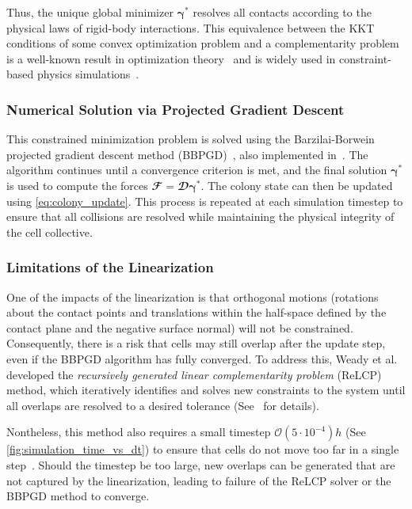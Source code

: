 \documentclass[conference]{IEEEtran}
\begin{document}
Thus, the unique global minimizer $ \boldsymbol{\gamma}^* $ resolves all contacts according to the physical laws of rigid-body interactions. This equivalence between the KKT conditions
of some convex optimization problem and a complementarity problem is a well-known result in
optimization theory~\cite{Nocedal2006} and is widely used in constraint-based physics simulations~\cite{Yan2022,Tasora2008, Yan2019, Li2021, Weady2024SM,Rudge2012,Macklin2014,Ferguson2021}.



\subsubsection{Numerical Solution via Projected Gradient Descent}

This constrained minimization problem is solved using the Barzilai-Borwein projected gradient descent method (BBPGD)~\cite{BBPGD}, also implemented in~\cite{Weady2024SM,Yan2019}. The algorithm continues until a convergence criterion is met, and the final solution $\boldsymbol{\gamma}^*$ is used to compute the forces $\mathbfcal{F} = \mathbfcal{D}\boldsymbol{\gamma}^*$. The colony state can then be updated using \autoref{eq:colony_update}. This process is repeated at each simulation timestep to ensure that all collisions are resolved while maintaining the physical integrity of the cell collective.

\subsubsection{Limitations of the Linearization}

One of the impacts of the linearization is that orthogonal motions (rotations about the contact points and translations within the half-space defined by the contact plane and the negative surface normal) will not be constrained. Consequently, there is a risk that cells may still overlap after the update step, even if the BBPGD algorithm has fully converged. To address this, Weady et al.~\cite{Weady2024SM} developed the \textit{recursively generated linear complementarity problem} (ReLCP) method, which iteratively identifies and solves new constraints to the system until all overlaps are resolved to a desired tolerance (See~\cite{Weady2024SM} for details).

Nontheless, this method also requires a small timestep $\mathcal{O}(5\cdot 10^{-4}) h$ (See \autoref{fig:simulation_time_vs_dt}) to ensure that cells do not move too far in a single step~\cite{Yan2022}. Should the timestep be too large, new overlaps can be generated that are not captured by the linearization, leading to failure of the ReLCP solver or the BBPGD method to converge.
\end{document}
